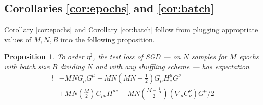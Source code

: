 \documentclass[openany, notitlepage, justified]{tufte-book}
\theoremstyle{plain}
\newtheorem{prop}{Proposition}
\theoremstyle{definition}
\newcommand{\wrap}[1]{\left(#1\right)}
\begin{document}
        \subsection{Corollaries \ref{cor:epochs} and \ref{cor:batch}}

            Corollary \ref{cor:epochs} and Corollary \ref{cor:batch} follow
            from plugging appropriate values of $M, N, B$ into the following
            proposition.

            \begin{prop}\label{prop:ordtwo}
                To order $\eta^2$, the test loss of SGD --- on $N$
                samples for $M$ epochs with batch size $B$ dividing $N$ and with any
                shuffling scheme --- has expectation
                {\small
                \begin{align*}
                                                            l              
                    &- MN                                   G_\mu G^\mu       
                     + MN\wrap{MN - \frac{1}{2}}            G_\mu H^{\mu}_{\nu} G^\nu \\
                    &+ MN\wrap{\frac{M}{2}}                 C_{\mu \nu} H^{\mu \nu}
                     + MN\wrap{\frac{M-\frac{1}{B}}{2}}     \wrap{\nabla_\mu C^{\nu}_{\nu}} G^\mu / 2
                \end{align*}
                }
            \end{prop}
\end{document}
